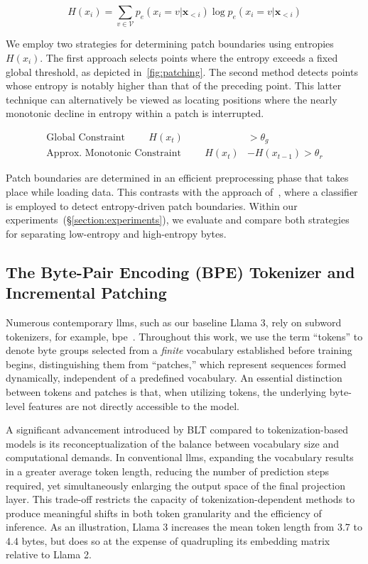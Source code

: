 \begin{equation}
H(x_i) = \sum_{v \in \mathcal{V}} p_{e}(x_i=v|\pmb{x}_{<i}) \log p_{e}(x_i=v|\pmb{x}_{<i})
\end{equation}

We employ two strategies for determining patch boundaries using entropies $H(x_i)$. The first approach selects points where the entropy exceeds a fixed global threshold, as depicted in~\autoref{fig:patching}. The second method detects points whose entropy is notably higher than that of the preceding point. This latter technique can alternatively be viewed as locating positions where the nearly monotonic decline in entropy within a patch is interrupted.

\begin{align*}
    \text{Global Constraint}\hspace{1cm}H(x_t)& > \theta_g\\
    \text{Approx. Monotonic Constraint}\hspace{1cm}H(x_t)& - H(x_{t-1}) > \theta_r
\end{align*}

Patch boundaries are determined in an efficient preprocessing phase that takes place while loading data. This contrasts with the approach of~\citet{nawrot-etal-2023-efficient}, where a classifier is employed to detect entropy-driven patch boundaries. Within our experiments~(\S\ref{section:experiments}), we evaluate and compare both strategies for separating low-entropy and high-entropy bytes.

\subsection{The Byte-Pair Encoding (BPE) Tokenizer and Incremental Patching}
\label{section:incremental-patching}
\label{section:bpe-patch}

Numerous contemporary llms, such as our baseline Llama 3, rely on subword tokenizers, for example, bpe~\citep{gage1994new, sennrich-etal-2016-neural}. Throughout this work, we use the term ``tokens'' to denote byte groups selected from a \textit{finite} vocabulary established before training begins, distinguishing them from ``patches,'' which represent sequences formed dynamically, independent of a predefined vocabulary. An essential distinction between tokens and patches is that, when utilizing tokens, the underlying byte-level features are not directly accessible to the model.

A significant advancement introduced by {\textsc BLT} compared to tokenization-based models is its reconceptualization of the balance between vocabulary size and computational demands. In conventional llms, expanding the vocabulary results in a greater average token length, reducing the number of prediction steps required, yet simultaneously enlarging the output space of the final projection layer. This trade-off restricts the capacity of tokenization-dependent methods to produce meaningful shifts in both token granularity and the efficiency of inference. As an illustration, Llama 3 increases the mean token length from 3.7 to 4.4 bytes, but does so at the expense of quadrupling its embedding matrix relative to Llama 2.


